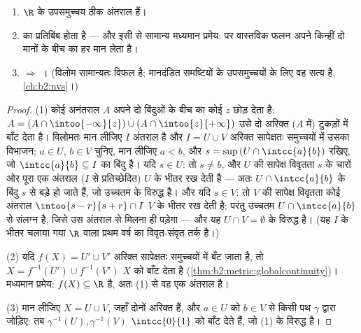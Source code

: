 \begin{theorem}\label{thm:b2:metric:connectedness}
\begin{enumerate}
  \item $\R$ के  उपसमुच्चय ठीक अंतराल हैं।
  \item {} का  प्रतिबिंब  होता है --- और इसी से
        सामान्य मध्यमान प्रमेय:  पर  वास्तविक फलन
        अपने किन्हीं दो मानों के बीच का हर मान लेता है।
  \item {} $\Rightarrow$ । (विलोम सामान्यतः विफल है; मानदंडित
        समष्टियों के  उपसमुच्चयों के लिए वह सत्य है, \cref{ch:b2:nvs}।)
\end{enumerate}
\end{theorem}

\begin{proof}
(1) कोई अनंतराल $A$ अपने दो बिंदुओं के बीच का कोई $z$ छोड़ देता है:
$A = (A \cap \intoo{-\infty}{z}) \cup (A \cap \intoo{z}{+\infty})$
उसे दो अरिक्त ($A$ में)  टुकड़ों में बाँट देता है। विलोमतः मान
लीजिए $I$ अंतराल है और $I = U \cup V$ अरिक्त सापेक्षतः  समुच्चयों में उसका
विभाजन; $a \in U$, $b \in V$ चुनिए, मान लीजिए $a < b$, और $s = \sup\,(U \cap \intcc{a}{b})$ रखिए, जो $\intcc{a}{b}
\subseteq I$ का बिंदु
है। यदि $s \in U$: तो $s \neq b$, और $U$ की सापेक्ष विवृतता $s$ के चारों ओर
पूरा एक अंतराल ($I$ से प्रतिच्छेदित) $U$ के भीतर रख देती है --- अतः
$U \cap \intcc{a}{b}$ के बिंदु $s$ से बड़े हो जाते हैं, जो उच्चतम के विरुद्ध है। और यदि
$s \in V$: तो $V$ की सापेक्ष विवृतता कोई अंतराल $\intoo{s - r}{s + r} \cap I$ $V$ के भीतर रख देती
है; परंतु उच्चतम $U \cap \intcc{a}{b}$ से संलग्न है, जिसे उस अंतराल से मिलना ही पड़ेगा
--- और यह $U \cap V = \emptyset$ के विरुद्ध है। (यह $I$ के भीतर चलाया गया $\R$ वाला
प्रथम वर्ष का विवृत-संवृत तर्क है।)

(2) यदि $f(X) = U' \cup V'$ अरिक्त सापेक्षतः  समुच्चयों में बँट जाता है, तो $X = f^{-1}(U') \cup f^{-1}(V')$
$X$ को बाँट देता है (\cref{thm:b2:metric:globalcontinuity})। मध्यमान प्रमेय: $f(X) \subseteq \R$  है, अतः (1) से
वह एक अंतराल है।

(3) मान लीजिए $X = U \cup V$, जहाँ दोनों अरिक्त  हैं, और $a \in U$ को $b \in V$ से किसी
पथ $\gamma$ द्वारा जोड़िए: तब $\gamma^{-1}(U),
\gamma^{-1}(V)$ $\intcc{0}{1}$ को बाँट देते हैं, जो (1) के विरुद्ध
है।
\end{proof}

